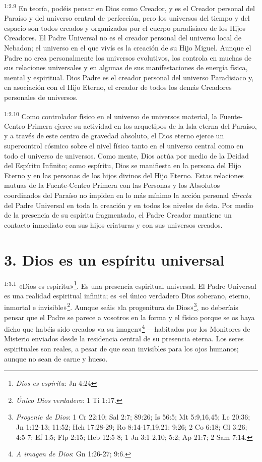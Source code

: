 \par
\textsuperscript{1:2.9} En teoría, podéis pensar en Dios como Creador, y es el Creador personal del Paraíso y del universo central de perfección, pero los universos del tiempo y del espacio son todos creados y organizados por el cuerpo paradisiaco de los Hijos Creadores. El Padre Universal no es el creador personal del universo local de Nebadon; el universo en el que vivís es la creación de su Hijo Miguel. Aunque el Padre no crea personalmente los universos evolutivos, los controla en muchas de sus relaciones universales y en algunas de sus manifestaciones de energía física, mental y espiritual. Dios Padre es el creador personal del universo Paradisiaco y, en asociación con el Hijo Eterno, el creador de todos los demás Creadores personales de universos.

\par
\textsuperscript{1:2.10} Como controlador físico en el universo de universos material, la Fuente-Centro Primera ejerce su actividad en los arquetipos de la Isla eterna del Paraíso, y a través de este centro de gravedad absoluto, el Dios eterno ejerce un supercontrol cósmico sobre el nivel físico tanto en el universo central como en todo el universo de universos. Como mente, Dios actúa por medio de la Deidad del Espíritu Infinito; como espíritu, Dios se manifiesta en la persona del Hijo Eterno y en las personas de los hijos divinos del Hijo Eterno. Estas relaciones mutuas de la Fuente-Centro Primera con las Personas y los Absolutos coordinados del Paraíso no impiden en lo más mínimo la acción personal \textit{directa} del Padre Universal en toda la creación y en todos los niveles de ésta. Por medio de la presencia de su espíritu fragmentado, el Padre Creador mantiene un contacto inmediato con sus hijos criaturas y con sus universos creados.

\section*{3. Dios es un espíritu universal}
\par
\textsuperscript{1:3.1} «Dios es espíritu»\footnote{\textit{Dios es espíritu}: Jn 4:24}. Es una presencia espiritual universal. El Padre Universal es una realidad espiritual infinita; es «el único verdadero Dios soberano, eterno, inmortal e invisible»\footnote{\textit{Único Dios verdadero}: 1 Ti 1:17.}. Aunque seáis «la progenitura de Dios»\footnote{\textit{Progenie de Dios}: 1 Cr 22:10; Sal 2:7; 89:26; Is 56:5; Mt 5:9,16,45; Lc 20:36; Jn 1:12-13; 11:52; Hch 17:28-29; Ro 8:14-17,19,21; 9:26; 2 Co 6:18; Gl 3:26; 4:5-7; Ef 1:5; Flp 2:15; Heb 12:5-8; 1 Jn 3:1-2,10; 5:2; Ap 21:7; 2 Sam 7:14.}, no deberíais pensar que el Padre se parece a vosotros en la forma y el físico porque se os haya dicho que habéis sido creados «a su imagen»\footnote{\textit{A imagen de Dios}: Gn 1:26-27; 9:6.} ---habitados por los Monitores de Misterio enviados desde la residencia central de su presencia eterna. Los seres espirituales son reales, a pesar de que sean invisibles para los ojos humanos; aunque no sean de carne y hueso.

